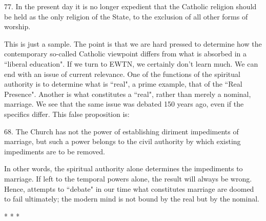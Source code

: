 \begin{quotex}
77. In the present day it is no longer expedient that the Catholic religion should be held as the only religion of the State, to the exclusion of all other forms of worship. 

\end{quotex}
This is just a sample. The point is that we are hard pressed to determine how the contemporary so-called Catholic viewpoint differs from what is absorbed in a ``liberal education". If we turn to EWTN, we certainly don't learn much. We can end with an issue of current relevance. One of the functions of the spiritual authority is to determine what is ``real", a prime example, that of the ``Real Presence". Another is what constitutes a ``real", rather than merely a nominal, marriage. We see that the same issue was debated 150 years ago, even if the specifics differ. This false proposition is:

\begin{quotex}
68. The Church has not the power of establishing diriment impediments of marriage, but such a power belongs to the civil authority by which existing impediments are to be removed. 

\end{quotex}
In other words, the spiritual authority alone determines the impediments to marriage. If left to the temporal powers alone, the result will always be wrong. Hence, attempts to ``debate" in our time what constitutes marriage are doomed to fail ultimately; the modern mind is not bound by the real but by the nominal.




\begin{center}* * *\end{center}

